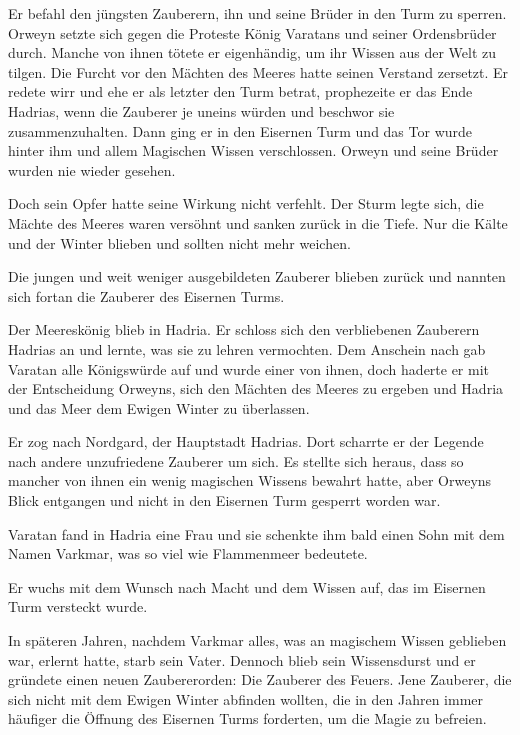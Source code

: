 \documentclass[10pt, a4paper, oneside]{book}
\begin{document}
\begin{multicols}{2}
Er befahl den jüngsten Zauberern, ihn und seine Brüder in den Turm zu sperren. Orweyn setzte sich gegen die Proteste König Varatans und seiner Ordensbrüder durch. Manche von ihnen tötete er eigenhändig, um ihr Wissen aus der Welt zu tilgen. Die Furcht vor den Mächten des Meeres hatte seinen Verstand zersetzt. Er redete wirr und ehe er als letzter den Turm betrat, prophezeite er das Ende Hadrias, wenn die Zauberer je uneins würden und beschwor sie zusammenzuhalten. Dann ging er in den Eisernen Turm und das Tor wurde hinter ihm und allem Magischen Wissen verschlossen. Orweyn und seine Brüder wurden nie wieder gesehen.\bigskip

Doch sein Opfer hatte seine Wirkung nicht verfehlt. Der Sturm legte sich, die Mächte des Meeres waren versöhnt und sanken zurück in die Tiefe. Nur die Kälte und der Winter blieben und sollten nicht mehr weichen.\bigskip

Die jungen und weit weniger ausgebildeten Zauberer blieben zurück und nannten sich fortan die Zauberer des Eisernen Turms.\bigskip

Der Meereskönig blieb in Hadria. Er schloss sich den verbliebenen Zauberern Hadrias an und lernte, was sie zu lehren vermochten. Dem Anschein nach gab Varatan alle Königswürde auf und wurde einer von ihnen, doch haderte er mit der Entscheidung Orweyns, sich den Mächten des Meeres zu ergeben und Hadria und das Meer dem Ewigen Winter zu überlassen.\bigskip

Er zog nach Nordgard, der Hauptstadt Hadrias. Dort scharrte er der Legende nach andere unzufriedene Zauberer um sich. Es stellte sich heraus, dass so mancher von ihnen ein wenig magischen Wissens bewahrt hatte, aber Orweyns Blick entgangen  und nicht in den Eisernen Turm gesperrt worden war.\bigskip

Varatan fand in Hadria eine Frau und sie schenkte ihm bald einen Sohn mit dem Namen Varkmar, was so viel wie Flammenmeer bedeutete.\bigskip

Er wuchs mit dem Wunsch nach Macht und dem Wissen auf, das im Eisernen Turm versteckt wurde.\bigskip

In späteren Jahren, nachdem Varkmar alles, was an magischem Wissen geblieben war, erlernt hatte, starb sein Vater. Dennoch blieb sein Wissensdurst und er gründete einen neuen Zaubererorden: Die Zauberer des Feuers. Jene Zauberer, die sich nicht mit dem Ewigen Winter abfinden wollten, die in den Jahren immer häufiger die Öffnung des Eisernen Turms forderten, um die Magie zu befreien.\bigskip


\end{multicols}
\end{document}
